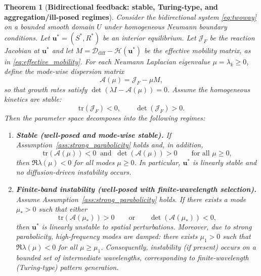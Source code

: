 \documentclass[pdflatex,sn-mathphys-ay]{sn-jnl}
\theoremstyle{thmstyleone}
\newtheorem{theorem}{Theorem}[section]
\theoremstyle{definition}
\theoremstyle{remark}
\begin{document}
\begin{theorem}[\textbf{Bidirectional feedback: stable, Turing-type, and aggregation/ill-posed regimes}]
\label{thm:twoway_classification}
Consider the bidirectional system \eqref{eq:twoway} on a bounded smooth domain $U$ under homogeneous Neumann boundary conditions. 
Let $\mathbf{u}^*=(S^*,R^*)$ be an interior equilibrium. 
Let $\mathcal{J}_F$ be the reaction Jacobian at $\mathbf{u}^*$ and let $M=\mathcal{D}_{\mathrm{diff}}-\mathcal{H}(\mathbf{u}^*)$ be the effective mobility matrix, as in \eqref{eq:effective_mobility}. 
For each Neumann Laplacian eigenvalue $\mu=\lambda_k\ge 0$, define the mode-wise dispersion matrix
\[
\mathcal{A}(\mu)=\mathcal{J}_F-\mu M,
\]
so that growth rates satisfy $\det(\lambda I-\mathcal{A}(\mu))=0$. 
Assume the homogeneous kinetics are stable:
\begin{equation}
\label{eq:kinetic_stability}
\mathrm{tr}(\mathcal{J}_F)<0,\qquad \det(\mathcal{J}_F)>0.
\end{equation}
Then the parameter space decomposes into the following regimes:
\begin{enumerate}[label=(\roman*)]
\item \textbf{Stable (well-posed and mode-wise stable).}
If Assumption~\ref{ass:strong_parabolicity} holds and, in addition,
\begin{equation}
\label{eq:modewise_stability}
\mathrm{tr}(\mathcal{A}(\mu))<0 \ \text{ and }\ \det(\mathcal{A}(\mu))>0
\qquad \text{for all }\mu\ge 0,
\end{equation}
then $\Re\lambda(\mu)<0$ for all modes $\mu\ge 0$. 
In particular, $\mathbf{u}^*$ is linearly stable and no diffusion-driven instability occurs.

\item \textbf{Finite-band instability (well-posed with finite-wavelength selection).}
Assume Assumption~\ref{ass:strong_parabolicity} holds. 
If there exists a mode $\mu_* >0$ such that either
\begin{equation}
\label{eq:turing_condition_general}
\mathrm{tr}(\mathcal{A}(\mu_*))>0
\qquad\text{or}\qquad
\det(\mathcal{A}(\mu_*))<0,
\end{equation}
then $\mathbf{u}^*$ is linearly unstable to spatial perturbations. 
Moreover, due to strong parabolicity, high-frequency modes are damped: there exists $\mu_1>0$ such that $\Re\lambda(\mu)<0$ for all $\mu\ge \mu_1$. 
Consequently, instability (if present) occurs on a bounded set of intermediate wavelengths, corresponding to finite-wavelength (Turing-type) pattern generation.


\end{enumerate}
\end{theorem}
\end{document}

